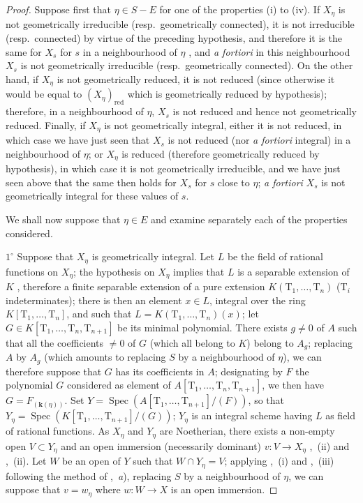 \begin{proof}
Suppose first that $\eta\in S-E$ for one of the properties (i) to (iv).
If $X_\eta$ is not geometrically irreducible (resp.\ geometrically connected), it is not irreducible (resp.\ connected) by virtue of the preceding hypothesis, and therefore it is the same for $X_s$ for $s$ in a neighbourhood of $\eta$ , and \emph{a fortiori} in this neighbourhood $X_s$ is not geometrically irreducible (resp.\ geometrically connected).
On the other hand, if $X_\eta$ is not geometrically reduced, it is not reduced (since otherwise it would be equal to $(X_\eta)_\mathrm{red}$ which is geometrically reduced by hypothesis); therefore, in a neighbourhood of $\eta$, $X_s$ is not reduced  and hence not geometrically reduced.
Finally, if $X_\eta$ is not geometrically integral, either it is not reduced, in which case we have just seen that $X_s$ is not reduced (nor \emph{a fortiori} integral) in a neighbourhood of $\eta$; or $X_\eta$ is reduced (therefore geometrically reduced by hypothesis), in which case it is not geometrically irreducible, and we have just seen above that the same then holds for $X_s$ for $s$ close to $\eta$; \emph{a fortiori} $X_s$ is not geometrically integral for these values of $s$.

We shall now suppose that $\eta\in E$ and examine separately each of the properties considered.

$1^\circ$ Suppose that $X_\eta$ is geometrically integral.
Let $L$ be the field of rational functions on $X_\eta$; the hypothesis on $X_\eta$ implies that $L$ is a separable extension of $K$ , therefore a finite separable extension of a pure extension $K(\mathrm{T}_1,\ldots,\mathrm{T}_n)$ ($\mathrm{T}_i$ indeterminates); there is then an element $x\in L$, integral over the ring $K[\mathrm{T}_1,\ldots,\mathrm{T}_n]$, and such that $L=K(\mathrm{T}_1,\ldots,\mathrm{T}_n)(x)$; let $G\in K[\mathrm{T}_1,\ldots,\mathrm{T}_n,\mathrm{T}_{n+1}]$ be its minimal polynomial.
There exists $g\neq 0$ of $A$ such that all the coefficients $\neq 0$ of $G$ (which all belong to $K$) belong to $A_g$; replacing $A$ by $A_g$ (which amounts to replacing $S$ by a neighbourhood of $\eta$), we can therefore suppose that $G$ has its coefficients in $A$; designating by $F$ the polynomial $G$ considered as element of $A[\mathrm{T}_1,\ldots,\mathrm{T}_n,\mathrm{T}_{n+1}]$, we then have $G=F_{(\boldsymbol{k}(\eta))}$.
Set $Y=\operatorname{Spec}(A[\mathrm{T}_1,\ldots,\mathrm{T}_{n+1}]/(F))$, so that $Y_\eta=\operatorname{Spec}(K[\mathrm{T}_1,\ldots,\mathrm{T}_{n+1}]/(G))$; $Y_\eta$ is an integral scheme having $L$ as field of rational functions.
As $X_\eta$ and $Y_\eta$ are Noetherian, there exists a non-empty open $V\subset Y_\eta$ and an open immersion (necessarily dominant) $v:V\to X_\eta$ ,~(ii) and ,~(ii).
Let $W$ be an open of $Y$ such that $W\cap Y_\eta=V$; applying ,~(i) and ,~(iii) following the method of ,~\emph{a}), replacing $S$ by a neighbourhood of $\eta$, we can suppose that $v=w_\eta$ where $w:W\to X$ is an open immersion.


\end{proof}
